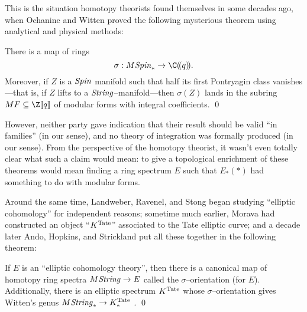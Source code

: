 This is the situation homotopy theorists found themselves in some decades ago, when Ochanine and Witten proved the following mysterious theorem using analytical and physical methods:

\begin{theorem}\label{OchanineWittenTheorem}
There is a map of rings \[\sigma: M\Spin_* \to \C(\!(q)\!).\]  Moreover, if $Z$ is a $\mathit{Spin}$ manifold such that half its first Pontryagin class vanishes---that is, if $Z$ lifts to a $\mathit{String}$--manifold---then $\sigma(Z)$ lands in the subring $MF \subseteq \Z\ps{q}$ of modular forms with integral coefficients. \qed
\end{theorem}

\noindent However, neither party gave indication that their result should be valid ``in families'' (in our sense), and no theory of integration was formally produced (in our sense).  From the perspective of the homotopy theorist, it wasn't even totally clear what such a claim would mean: to give a topological enrichment of these theorems would mean finding a ring spectrum $E$ such that $E_*(*)$ had something to do with modular forms.

Around the same time, Landweber, Ravenel, and Stong began studying ``elliptic cohomology'' for independent reasons; sometime much earlier, Morava had constructed an object ``$K^{\mathrm{Tate}}$'' associated to the Tate elliptic curve; and a decade later Ando, Hopkins, and Strickland put all these together in the following theorem:

\begin{theorem}
If $E$ is an ``elliptic cohomology theory'', then there is a canonical map of homotopy ring spectra $M\mathit{String} \to E$ called the $\sigma$--orientation (for $E$).  Additionally, there is an elliptic spectrum $K^{\mathrm{Tate}}$ whose $\sigma$--orientation gives Witten's genus $M\mathit{String}_* \to K^{\mathrm{Tate}}_*$ . \qed
\end{theorem}

